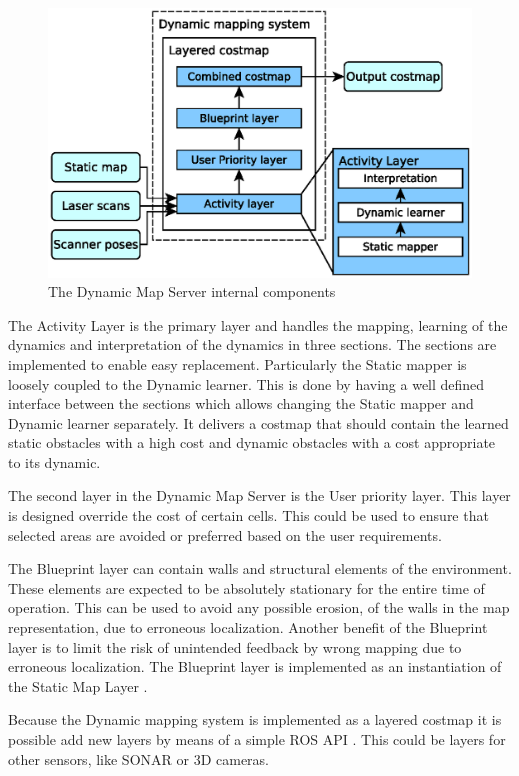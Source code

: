 \begin{figure}[htbp]
	\centering
	\includegraphics[scale=0.7]{chapters/cost_interpretation/figures/implementation_overview.eps}
	\caption{The Dynamic Map Server internal components}
	\label{fig:dynamic_map_server_internal}
\end{figure}

The Activity Layer is the primary layer and handles the mapping, learning of the dynamics and interpretation of the dynamics in three sections. 
The sections are implemented to enable easy replacement.
Particularly the Static mapper is loosely coupled to the Dynamic learner.
This is done by having a well defined interface between the sections which allows changing the Static mapper and Dynamic learner separately.
It delivers a costmap that should contain the learned static obstacles with a high cost and dynamic obstacles with a cost appropriate to its dynamic.
 

The second layer in the Dynamic Map Server is the User priority layer. This layer is designed override the cost of certain cells. This could be used to ensure that selected areas are avoided or preferred based on the user requirements. 

The Blueprint layer can contain walls and structural elements of the environment.
These elements are expected to be absolutely stationary for the entire time of operation.
This can be used to avoid any possible erosion, of the walls in the map representation, due to erroneous localization.
Another benefit of the Blueprint layer is to limit the risk of unintended feedback by wrong mapping due to  erroneous localization.
The Blueprint layer is implemented as an instantiation of the Static Map Layer \cite{lu2014layered}. 

Because the Dynamic mapping system is implemented as a layered costmap it is possible add new layers by means of a simple ROS API \cite{plugin_lib}. This could be layers for other sensors, like SONAR \cite{range_sensor_layer} or 3D cameras.

